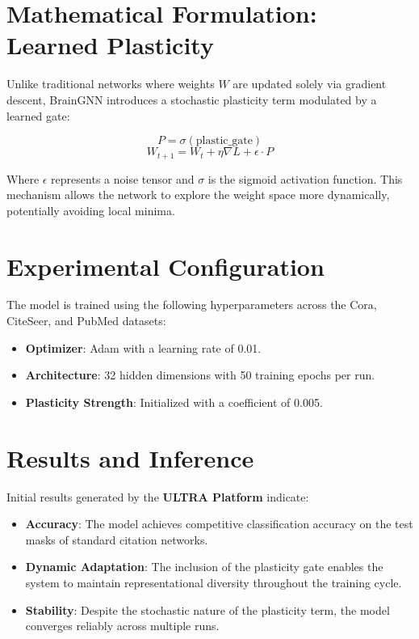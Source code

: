 \documentclass[12pt]{article}
\begin{document}
\section{Mathematical Formulation: Learned Plasticity}

Unlike traditional networks where weights $W$ are updated solely via gradient descent, BrainGNN introduces a stochastic plasticity term modulated by a learned gate:

\[
P = \sigma(\text{plastic\_gate})
\]
\[
W_{t+1} = W_t + \eta \nabla L + \epsilon \cdot P
\]

Where $\epsilon$ represents a noise tensor and $\sigma$ is the sigmoid activation function. This mechanism allows the network to explore the weight space more dynamically, potentially avoiding local minima.

\section{Experimental Configuration}

The model is trained using the following hyperparameters across the Cora, CiteSeer, and PubMed datasets:

\begin{itemize}
\item \textbf{Optimizer}: Adam with a learning rate of 0.01.
\item \textbf{Architecture}: 32 hidden dimensions with 50 training epochs per run.
\item \textbf{Plasticity Strength}: Initialized with a coefficient of 0.005.
\end{itemize}

\section{Results and Inference}

Initial results generated by the \textbf{ULTRA Platform} indicate:
\begin{itemize}
\item \textbf{Accuracy}: The model achieves competitive classification accuracy on the test masks of standard citation networks.
\item \textbf{Dynamic Adaptation}: The inclusion of the plasticity gate enables the system to maintain representational diversity throughout the training cycle.
\item \textbf{Stability}: Despite the stochastic nature of the plasticity term, the model converges reliably across multiple runs.
\end{itemize}
\end{document}
